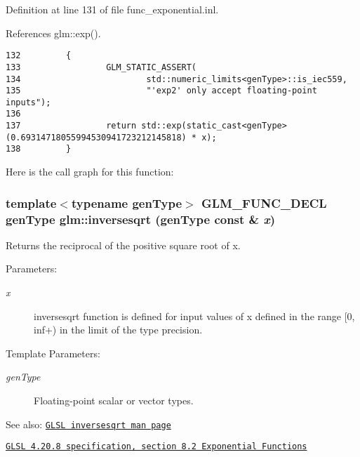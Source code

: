 Definition at line 131 of file func\_\-exponential.inl.

References glm::exp().

\begin{Code}\begin{verbatim}132         {
133                 GLM_STATIC_ASSERT(
134                         std::numeric_limits<genType>::is_iec559,
135                         "'exp2' only accept floating-point inputs");
136 
137                 return std::exp(static_cast<genType>(0.69314718055994530941723212145818) * x);
138         }
\end{verbatim}
\end{Code}




Here is the call graph for this function:\hypertarget{group__core__func__exponential_ga190c750b7eefaeb15431987d41177d1}{
\subsubsection[inversesqrt]{\setlength{\rightskip}{0pt plus 5cm}template$<$typename genType$>$ GLM\_\-FUNC\_\-DECL genType glm::inversesqrt (genType const \& {\em x})}}
\label{group__core__func__exponential_ga190c750b7eefaeb15431987d41177d1}


Returns the reciprocal of the positive square root of x.

\begin{Desc}
\item[Parameters:]
\begin{description}
\item[{\em x}]inversesqrt function is defined for input values of x defined in the range \mbox{[}0, inf+) in the limit of the type precision. \end{description}
\end{Desc}
\begin{Desc}
\item[Template Parameters:]
\begin{description}
\item[{\em genType}]Floating-point scalar or vector types.\end{description}
\end{Desc}
\begin{Desc}
\item[See also:]\href{http://www.opengl.org/sdk/docs/manglsl/xhtml/inversesqrt.xml}{\tt GLSL inversesqrt man page} 

\href{http://www.opengl.org/registry/doc/GLSLangSpec.4.20.8.pdf}{\tt GLSL 4.20.8 specification, section 8.2 Exponential Functions} \end{Desc}


